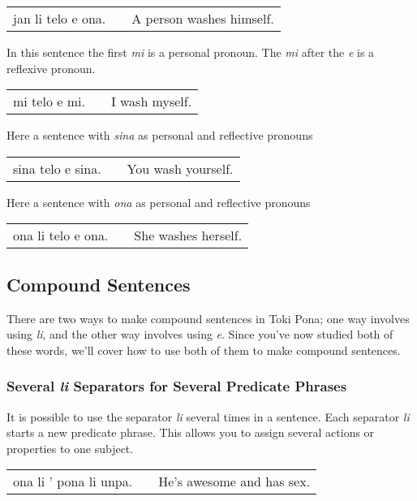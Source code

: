 \begin{supertabular}{p{5,5cm}|ll}
    jan li telo e ona. &  & A person washes himself. \\
\end{supertabular}

In this sentence the first \textit{mi} is a personal pronoun.
The \textit{mi} after the \textit{e} is a reflexive pronoun.

\begin{supertabular}{p{5,5cm}|ll}
    mi telo e mi. &  & I wash myself. \\
\end{supertabular}

Here a sentence with \textit{sina} as personal and reflective pronouns

\begin{supertabular}{p{5,5cm}|ll}
    sina telo e sina. &  & You wash yourself. \\
\end{supertabular}

Here a sentence with \textit{ona} as personal and reflective pronouns

\begin{supertabular}{p{5,5cm}|ll}
    ona li telo e ona. &  & She washes herself. \\
\end{supertabular}

\subsection*{Compound Sentences}
There are two ways to make compound sentences in Toki Pona; one way involves using \textit{li}, and the other way involves using \textit{e}.
Since you've now studied both of these words, we'll cover how to use both of them to make compound sentences.

\label{'multiple_li'}
\subsubsection*{Several \textit{li} Separators for Several Predicate Phrases}
It is possible to use the separator \textit{li} several times in a sentence.
Each separator \textit{li} starts a new predicate phrase.
This allows you to assign several actions or properties to one subject.

\begin{supertabular}{p{5,5cm}|ll}
    ona li ' pona li unpa. &  & He's awesome and has sex. \\
\end{supertabular}

